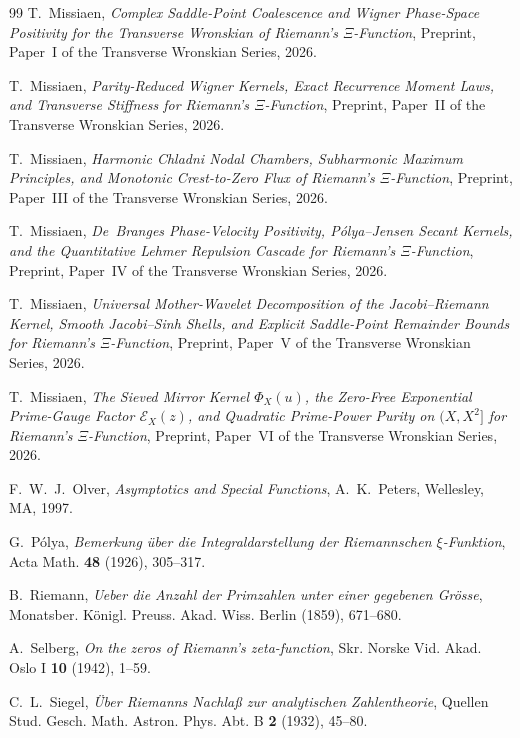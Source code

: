 \documentclass[11pt,reqno]{amsart}
\theoremstyle{definition}
\theoremstyle{remark}
\numberwithin{equation}{section}
\begin{document}
\begin{thebibliography}{99}
T.~Missiaen,
\emph{Complex Saddle-Point Coalescence and Wigner Phase-Space Positivity for the Transverse Wronskian of Riemann's $\Xi$-Function},
Preprint, Paper~I of the Transverse Wronskian Series, 2026.

T.~Missiaen,
\emph{Parity-Reduced Wigner Kernels, Exact Recurrence Moment Laws, and Transverse Stiffness for Riemann's $\Xi$-Function},
Preprint, Paper~II of the Transverse Wronskian Series, 2026.

T.~Missiaen,
\emph{Harmonic Chladni Nodal Chambers, Subharmonic Maximum Principles, and Monotonic Crest-to-Zero Flux of Riemann's $\Xi$-Function},
Preprint, Paper~III of the Transverse Wronskian Series, 2026.

T.~Missiaen,
\emph{De~Branges Phase-Velocity Positivity, P\'olya--Jensen Secant Kernels, and the Quantitative Lehmer Repulsion Cascade for Riemann's $\Xi$-Function},
Preprint, Paper~IV of the Transverse Wronskian Series, 2026.

T.~Missiaen,
\emph{Universal Mother-Wavelet Decomposition of the Jacobi--Riemann Kernel, Smooth Jacobi--Sinh Shells, and Explicit Saddle-Point Remainder Bounds for Riemann's $\Xi$-Function},
Preprint, Paper~V of the Transverse Wronskian Series, 2026.

T.~Missiaen,
\emph{The Sieved Mirror Kernel $\Phi_X(u)$, the Zero-Free Exponential Prime-Gauge Factor $\mathcal{E}_X(z)$, and Quadratic Prime-Power Purity on $(X, X^2]$ for Riemann's $\Xi$-Function},
Preprint, Paper~VI of the Transverse Wronskian Series, 2026.

F.~W.~J.~Olver,
\emph{Asymptotics and Special Functions},
A.~K.~Peters, Wellesley, MA, 1997.

G.~P\'olya,
\emph{Bemerkung \"uber die Integraldarstellung der Riemannschen $\xi$-Funktion},
Acta Math. \textbf{48} (1926), 305--317.

B.~Riemann,
\emph{Ueber die Anzahl der Primzahlen unter einer gegebenen Gr\"osse},
Monatsber. K\"onigl. Preuss. Akad. Wiss. Berlin (1859), 671--680.

A.~Selberg,
\emph{On the zeros of Riemann's zeta-function},
Skr. Norske Vid. Akad. Oslo I \textbf{10} (1942), 1--59.

C.~L.~Siegel,
\emph{\"Uber Riemanns Nachla\ss{} zur analytischen Zahlentheorie},
Quellen Stud. Gesch. Math. Astron. Phys. Abt. B \textbf{2} (1932), 45--80.


\end{thebibliography}
\end{document}
